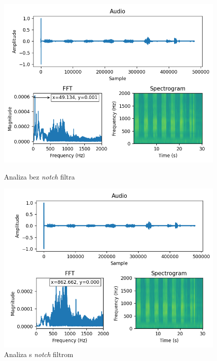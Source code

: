 \begin{figure}[ht]
	\begin{minipage}[t]{0.5\textwidth}
		\includegraphics[width=\linewidth]{imgs/without_notch}
		\caption{Analiza bez \textit{notch} filtra}
		\label{fig:without_notch}
	\end{minipage}
	\hspace*{\fill}
	\begin{minipage}[t]{0.5\textwidth}
		\includegraphics[width=\linewidth]{imgs/with_notch}
		\caption{Analiza s \textit{notch} filtrom}
		\label{fig:with_notch}
	\end{minipage}
\end{figure}

